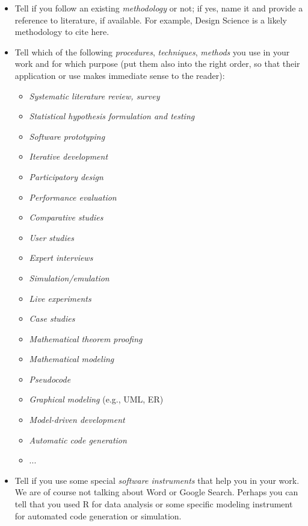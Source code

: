 \begin{itemize}
\item[\Square] Tell if you follow an existing \emph{methodology} or not; if yes, name it and provide a reference to literature, if available. For example, Design Science \cite{hevner2004design} is a likely methodology to cite here.
\item[\Square] Tell which of the following \emph{procedures}, \emph{techniques}, \emph{methods} you use in your work and for which purpose (put them also into the right order, so that their application or use makes immediate sense to the reader):
\begin{itemize}
\item[\Square] \emph{Systematic literature review, survey}
\item[\Square] \emph{Statistical hypothesis formulation and testing}
\item[\Square] \emph{Software prototyping}
\item[\Square] \emph{Iterative development}
\item[\Square] \emph{Participatory design}
\item[\Square] \emph{Performance evaluation}
\item[\Square] \emph{Comparative studies}
\item[\Square] \emph{User studies}
\item[\Square] \emph{Expert interviews}
\item[\Square] \emph{Simulation/emulation}
\item[\Square] \emph{Live experiments}
\item[\Square] \emph{Case studies}
\item[\Square] \emph{Mathematical theorem proofing}
\item[\Square] \emph{Mathematical modeling}
\item[\Square] \emph{Pseudocode}
\item[\Square] \emph{Graphical modeling} (e.g., UML, ER)
\item[\Square] \emph{Model-driven development}
\item[\Square] \emph{Automatic code generation}
\item[\Square] ...
\end{itemize}

\item[\Square] Tell if you use some special \emph{software instruments} that help you in your work. We are of course not talking about Word or Google Search. Perhaps you can tell that you used R for data analysis or some specific modeling instrument for automated code generation or simulation.
\end{itemize}



